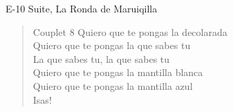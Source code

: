 \begin{song}[vals]{E-10 Suite, La Ronda de Maruiqilla}
\begin{verse}{Couplet 8}
\chord{}Quiero que te pongas la decolarada\\
Quiero que te pongas la que sabes tu\\
La que sabes tu, la que sabes tu\\
\chord{}Quiero que te pongas la mantilla blanca\\
Quiero que te pongas la mantilla azul\\
\chord{}Isas!\hspace{1em}\hspace{1em}
\end{verse}
\end{song}

